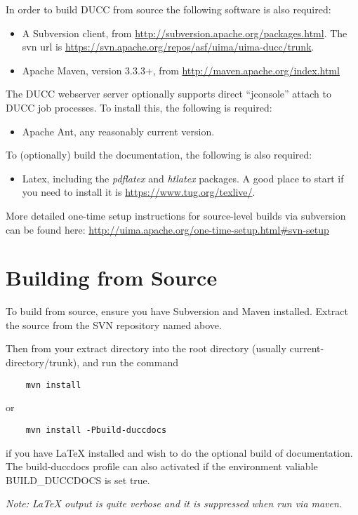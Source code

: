   
In order to build DUCC from source the following software is also required:
\begin{itemize}
    \item A Subversion client, from \url{http://subversion.apache.org/packages.html}.  The
      svn url is \url{https://svn.apache.org/repos/asf/uima/uima-ducc/trunk}.
    \item Apache Maven, version 3.3.3+, from \url{http://maven.apache.org/index.html}
\end{itemize}

The DUCC webserver server optionally supports direct ``jconsole'' attach to DUCC job processes.  To install
this, the following is required:
\begin{itemize}
    \item Apache Ant, any reasonably current version.
\end{itemize}
    
To (optionally) build the documentation, the following is also required:
\begin{itemize}
  \item Latex, including the \emph{pdflatex} and \emph{htlatex} packages.  A good place
    to start if you need to install it is \url{https://www.tug.org/texlive/}.
\end{itemize}

More detailed one-time setup instructions for source-level builds via subversion can be found here:
\url{http://uima.apache.org/one-time-setup.html#svn-setup}

\section{Building from Source}

To build from source, ensure you have
Subversion and Maven installed.  Extract the source from the SVN repository named above. 

Then from your extract directory into
the root directory (usually current-directory/trunk), and run the command
\begin{verbatim}
    mvn install
\end{verbatim}
or
\begin{verbatim}
    mvn install -Pbuild-duccdocs
\end{verbatim}
if you have LaTeX installed and wish to do the optional build of documentation.
The build-duccdocs profile can also activated if the environment valiable BUILD\_DUCCDOCS is set true.

{\em Note: LaTeX output is quite verbose and it is suppressed when run via maven.}

